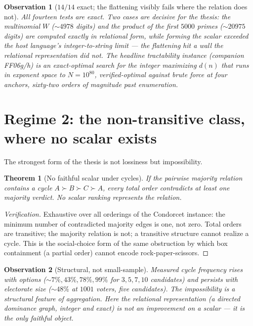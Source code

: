 \documentclass[11pt]{article}
\newtheorem{theorem}{Theorem}\newtheorem{proposition}{Proposition}
\newtheorem{observation}{Observation}
\begin{document}
\begin{observation}[$14/14$ exact; the flattening visibly fails where the relation does not]
All fourteen tests are exact. Two cases are decisive for the thesis: the multinomial $W$ ($\sim\!4978$
digits) and the product of the first $5000$ primes ($\sim\!20975$ digits) are computed exactly in relational
form, while \emph{forming the scalar} exceeded the host language's integer-to-string limit --- the flattening
hit a wall the relational representation did not. The headline tractability instance (companion FF06g/h) is
an exact-optimal search for the integer maximizing $d(n)$ that runs in exponent space to $N=10^{80}$,
verified-optimal against brute force at four anchors, sixty-two orders of magnitude past enumeration.
\end{observation}

\section{Regime 2: the non-transitive class, where no scalar exists}

The strongest form of the thesis is not lossiness but impossibility.

\begin{theorem}[No faithful scalar under cycles]
If the pairwise majority relation contains a cycle $A\succ B\succ C\succ A$, every total order contradicts at
least one majority verdict. No scalar ranking represents the relation.
\end{theorem}

\begin{proof}[Verification]
Exhaustive over all orderings of the Condorcet instance: the minimum number of contradicted majority edges
is one, not zero. Total orders are transitive; the majority relation is not; a transitive structure cannot
realize a cycle. This is the social-choice form of the same obstruction by which box containment (a partial
order) cannot encode rock-paper-scissors.
\end{proof}

\begin{observation}[Structural, not small-sample]
Measured cycle frequency rises with options ($\sim\!7\%,43\%,78\%,99\%$ for $3,5,7,10$ candidates) and
persists with electorate size ($\sim\!48\%$ at $1001$ voters, five candidates). The impossibility is a
structural feature of aggregation. Here the relational representation (a directed dominance graph,
integer and exact) is not an improvement on a scalar --- it is the only faithful object.
\end{observation}
\end{document}
